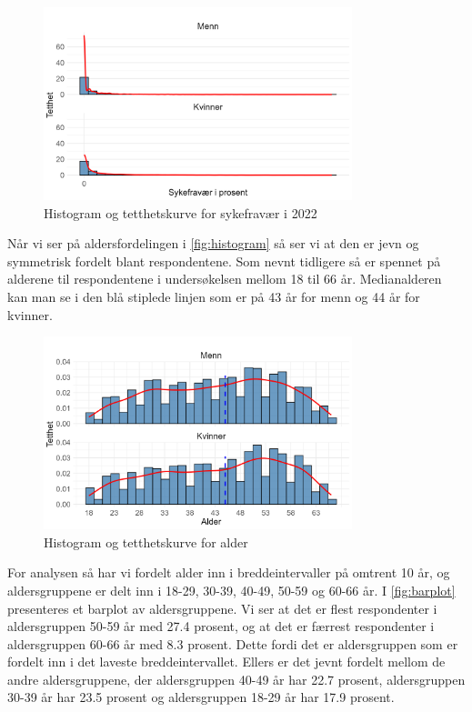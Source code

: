 \documentclass[
  12pt,
  a4paper,
  DIV=11,
  numbers=noendperiod]{scrartcl}
\begin{document}
\begin{figure}[H]
\caption{Histogram og tetthetskurve for sykefravær i 2022}
\label{fig:histogram}
\centering
\includegraphics[width=0.8\textwidth]{dokumentobjekter/figurer/fig_1.png}
\end{figure}

Når vi ser på aldersfordelingen i \autoref{fig:histogram} så ser vi at
den er jevn og symmetrisk fordelt blant respondentene. Som nevnt
tidligere så er spennet på alderene til respondentene i undersøkelsen
mellom 18 til 66 år. Medianalderen kan man se i den blå stiplede linjen
som er på 43 år for menn og 44 år for kvinner.

\begin{figure}[H]
\caption{Histogram og tetthetskurve for alder}
\label{fig:histogram}
\centering
\includegraphics[width=0.8\textwidth]{dokumentobjekter/figurer/fig_2.png}
\end{figure}

For analysen så har vi fordelt alder inn i breddeintervaller på omtrent
10 år, og aldersgruppene er delt inn i 18-29, 30-39, 40-49, 50-59 og
60-66 år. I \autoref{fig:barplot} presenteres et barplot av
aldersgruppene. Vi ser at det er flest respondenter i aldersgruppen
50-59 år med 27.4 prosent, og at det er færrest respondenter i
aldersgruppen 60-66 år med 8.3 prosent. Dette fordi det er aldersgruppen
som er fordelt inn i det laveste breddeintervallet. Ellers er det jevnt
fordelt mellom de andre aldersgruppene, der aldersgruppen 40-49 år har
22.7 prosent, aldersgruppen 30-39 år har 23.5 prosent og aldersgruppen
18-29 år har 17.9 prosent.
\end{document}
